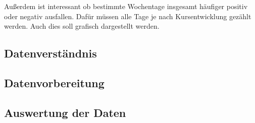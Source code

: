 Außerdem ist interessant ob bestimmte Wochentage insgesamt häufiger positiv oder negativ ausfallen. Dafür müssen alle Tage je nach Kursentwicklung gezählt werden. Auch dies soll grafisch dargestellt werden.


\subsection{Datenverständnis}


\subsection{Datenvorbereitung}
\label{sec:datenvorbereitung}

\subsection{Auswertung der Daten}

\clearpage
